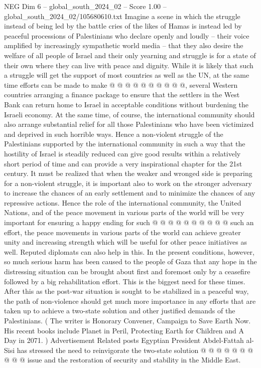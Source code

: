 \begin{textsample}{NEG Dim 6 – global\_south\_2024\_02 – Score 1.00 – global\_south\_2024\_02/105680610.txt}
Imagine a scene in which the struggle instead of being led by the battle cries of the likes of Hamas is instead led by peaceful processions of Palestinians who declare openly and loudly -- their voice amplified by increasingly sympathetic world media -- that they also desire the welfare of all people of Israel and their only yearning and struggle is for a state of their own where they can live with peace and dignity.
While it is likely that such a struggle will get the support of most countries as well as the UN, at the same time efforts can be made to make @ @ @ @ @ @ @ @ @ @, several Western countries arranging a finance package to ensure that the settlers in the West Bank can return home to Israel in acceptable conditions without burdening the Israeli economy.
At the same time, of course, the international community should also arrange substantial relief for all those Palestinians who have been victimized and deprived in such horrible ways.
Hence a non-violent struggle of the Palestinians supported by the international community in such a way that the hostility of Israel is steadily reduced can give good results within a relatively short period of time and can provide a very inspirational chapter for the 21st century.
It must be realized that when the weaker and wronged side is preparing for a non-violent struggle, it is important also to work on the stronger adversary to increase the chances of an early settlement and to minimize the chances of any repressive actions.
Hence the role of the international community, the United Nations, and of the peace movement in various parts of the world will be very important for ensuring a happy ending for such @ @ @ @ @ @ @ @ @ @ such an effort, the peace movements in various parts of the world can achieve greater unity and increasing strength which will be useful for other peace initiatives as well.
Reputed diplomats can also help in this.
In the present conditions, however, so much serious harm has been caused to the people of Gaza that any hope in the distressing situation can be brought about first and foremost only by a ceasefire followed by a big rehabilitation effort.
This is the biggest need for these times.
After this as the post-war situation is sought to be stabilized in a peaceful way, the path of non-violence should get much more importance in any efforts that are taken up to achieve a two-state solution and other justified demands of the Palestinians. ( The writer is Honorary Convener, Campaign to Save Earth Now.
His recent books include Planet in Peril, Protecting Earth for Children and A Day in 2071. ) Advertisement Related posts Egyptian President Abdel-Fattah al-Sisi has stressed the need to reinvigorate the two-state solution @ @ @ @ @ @ @ @ @ @ issue and the restoration of security and stability in the Middle East.

\end{textsample}

